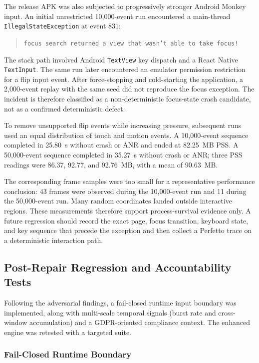 The release APK was also subjected to progressively stronger Android Monkey input. An initial unrestricted 10,000-event run encountered a main-thread
\texttt{IllegalStateException} at event 831:

\begin{quote}
\texttt{focus search returned a view that wasn't able to take focus!}
\end{quote}

The stack path involved Android \texttt{TextView} key dispatch and a React Native \texttt{TextInput}. The same run later encountered an emulator permission restriction for a flip input event. After force-stopping and cold-starting the application, a 2,000-event replay with the same seed did not reproduce the focus exception. The incident is therefore classified as a non-deterministic focus-state crash candidate, not as a confirmed deterministic defect.

To remove unsupported flip events while increasing pressure, subsequent runs used an equal distribution of touch and motion events. A 10,000-event sequence completed in 25.80~s without crash or ANR and ended at 82.25~MB PSS. A 50,000-event sequence completed in 35.27~s without crash or ANR; three PSS readings were 86.37, 92.77, and 92.76~MB, with a mean of 90.63~MB.

The corresponding frame samples were too small for a representative performance conclusion: 43 frames were observed during the 10,000-event run and 11 during the 50,000-event run. Many random coordinates landed outside interactive regions. These measurements therefore support process-survival evidence only. A future regression should record the exact page, focus transition, keyboard state, and key sequence that precede the exception and then collect a Perfetto trace on a deterministic interaction path.

\subsection{Post-Repair Regression and Accountability Tests}

Following the adversarial findings, a fail-closed runtime input boundary was implemented, along with multi-scale temporal signals (burst rate and cross-window accumulation) and a GDPR-oriented compliance context. The enhanced engine was retested with a targeted suite.

\subsubsection{Fail-Closed Runtime Boundary}

